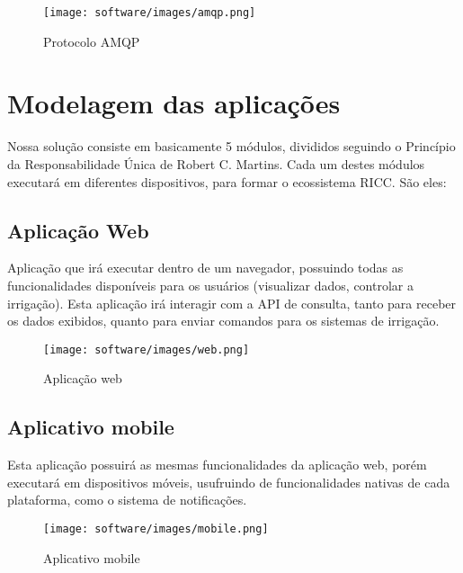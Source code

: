     \begin{figure}[H]
        \centering
        \texttt{[image: software/images/amqp.png]}
        \caption{Protocolo AMQP}
        \label{fig:amqp}
    \end{figure}

    \section{Modelagem das aplicações}
    
    Nossa solução consiste em basicamente 5 módulos, divididos seguindo  o Princípio da Responsabilidade Única de Robert C. Martins. Cada um destes módulos executará em diferentes dispositivos, para formar o  ecossistema RICC. São eles:
    
    \subsection{Aplicação Web}

    Aplicação que irá executar dentro de um navegador, possuindo todas as funcionalidades disponíveis para os usuários (visualizar dados, controlar a irrigação).
	Esta aplicação irá interagir com a API de consulta, tanto para receber os dados exibidos, quanto para enviar comandos para os sistemas de irrigação.

    \begin{figure}[H]
    	
    	\centering
        \texttt{[image: software/images/web.png]}
        \caption{Aplicação web}
        \label{fig:web}
    \end{figure}

    \subsection{Aplicativo mobile}

    Esta aplicação possuirá as mesmas funcionalidades da aplicação web, porém executará em dispositivos móveis, usufruindo de funcionalidades nativas de cada plataforma, como o sistema de notificações.

    \begin{figure}[H]
    	
    	\centering
        \texttt{[image: software/images/mobile.png]}
        \caption{Aplicativo mobile}
        \label{fig:mobile}
    \end{figure}

